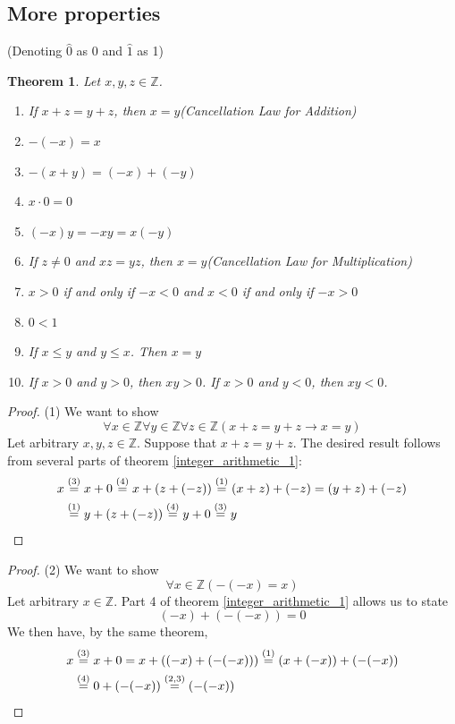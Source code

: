 \documentclass{report}
\newtheorem{theorem}[theo]{Theorem}
\begin{document}
\subsection{More properties}
(Denoting $\hat0$ as 0 and $\hat1$ as 1)
\begin{theorem}\label{integer_arithmetic_2}
Let $x,y,z\in\mathbb Z$.
\begin{enumerate}
\item If $x+z=y+z$, then $x=y$\quad(Cancellation Law for Addition)
\item $-(-x)=x$
\item $-(x+y)=(-x)+(-y)$
\item $x\cdot0=0$
\item $(-x)y=-xy=x(-y)$
\item If $z\neq0$ and $xz=yz$, then $x=y$\quad(Cancellation Law for Multiplication)
\item $x>0$ if and only if $-x<0$ and $x<0$ if and only if $-x>0$
\item $0<1$
\item If $x\leq y$ and $y\leq x$. Then $x=y$
\item If $x>0$ and $y>0$, then $xy>0$. If $x>0$ and $y<0$, then $xy<0$.
\end{enumerate}
\end{theorem}
\begin{proof}(1) We want to show
\begin{equation*}
\forall x\in\mathbb Z\forall y\in\mathbb Z\forall z\in\mathbb Z
(x+z=y+z\to x=y)
\end{equation*}
Let arbitrary $x,y,z\in\mathbb Z$. Suppose that $x+z=y+z$.
The desired result follows from several parts of theorem \ref{integer_arithmetic_1}:
\begin{align*}
x&\overset{(3)}{=}x+0\overset{(4)}{=}x+(z+(-z))\overset{(1)}{=}(x+z)+(-z)=(y+z)+(-z)\\
&\overset{(1)}{=}y+(z+(-z))\overset{(4)}{=}y+0\overset{(3)}{=}y\qedhere
\end{align*}
\end{proof}
\begin{proof}(2)
We want to show
\begin{equation*}
\forall x\in\mathbb Z(-(-x)=x)
\end{equation*}
Let arbitrary $x\in\mathbb Z$. Part 4 of theorem \ref{integer_arithmetic_1} allows us to state
\begin{equation*}
(-x)+(-(-x))=0
\end{equation*}
We then have, by the same theorem,
\begin{align*}
x&\overset{(3)}{=}x+0=x+((-x)+(-(-x)))\overset{(1)}{=}(x+(-x))+(-(-x))\\
&\overset{(4)}{=}0+(-(-x))\overset{(2,3)}{=}(-(-x))\qedhere
\end{align*}
\end{proof}
\end{document}
